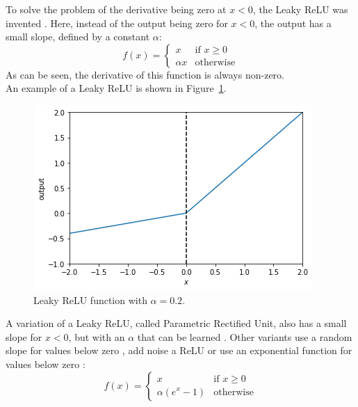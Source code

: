To solve the problem of the derivative being zero at $x<0$, the Leaky ReLU was invented \citep{maas2013rectifier}. Here, instead of the output being zero for $x<0$, the output has a small slope, defined by a constant $\alpha$:
\begin{equation}
    f(x) = \begin{cases}
        x & \text{if $x \ge 0$}\\
        \alpha x & \text{otherwise}
        \end{cases}
\end{equation}
As can be seen, the derivative of this function is always non-zero.\\
An example of a Leaky ReLU is shown in Figure~\ref{fig:lrelu}.\\
\begin{figure}[htb]
    \centering
    \includegraphics[width=.8\linewidth]{images/activation_functions/lrelu.png}
    \caption[Leaky ReLU function]{Leaky ReLU function with $\alpha = 0.2$.}
    \label{fig:lrelu}
\end{figure}

A variation of a Leaky ReLU, called Parametric Rectified Unit, also has a small slope for $x<0$, but with an $\alpha$ that can be learned \citep{journals/corr/HeZR015}. Other variants use a random slope for values below zero \citep{journals/corr/XuWCL15}, add noise a ReLU \citep{conf/icml/NairH10} or use an exponential function for values below zero \citep{journals/corr/ClevertUH15}:
\begin{equation}
    f(x) = \begin{cases}
        x & \text{if $x \ge 0$}\\
        \alpha (e^x-1) & \text{otherwise}
        \end{cases}
\end{equation}

